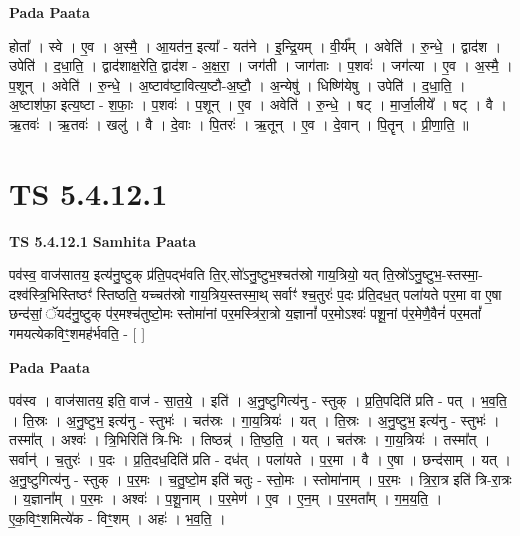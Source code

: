 \documentclass[17pt]{extarticle}
\begin{document}
\textbf{Pada Paata} \newline

होता᳚ । स्वे । ए॒व । अ॒स्मै॒ । आ॒यत॑न॒ इत्या᳚ - यत॑ने । इ॒न्द्रि॒यम् । वी॒र्य᳚म् । अवेति॑ । रु॒न्धे॒ । द्वाद॑श । उपेति॑ । द॒धा॒ति॒ । द्वाद॑शाक्ष॒रेति॒ द्वाद॑श - अ॒क्ष॒रा॒ । जग॑ती । जाग॑ताः । प॒शवः॑ । जग॑त्या । ए॒व । अ॒स्मै॒ । प॒शून् । अवेति॑ । रु॒न्धे॒ । अ॒ष्टाव॑ष्टा॒वित्य॒ष्टौ-अ॒ष्टौ॒ । अ॒न्येषु॑ । धिष्णि॑येषु । उपेति॑ । द॒धा॒ति॒ । अ॒ष्टाश॑फा॒ इत्य॒ष्टा - श॒फाः॒ । प॒शवः॑ । प॒शून् । ए॒व । अवेति॑ । रु॒न्धे॒ । षट् । मा॒र्जा॒लीये᳚ । षट् । वै । ऋ॒तवः॑ । ऋ॒तवः॑ । खलु॑ । वै । दे॒वाः । पि॒तरः॑ । ऋ॒तून् । ए॒व । दे॒वान् । पि॒तॄन् । प्री॒णा॒ति॒ ॥  \newline




\section*{ TS 5.4.12.1 }

\textbf{TS 5.4.12.1 } \newline
\textbf{Samhita Paata} \newline

पव॑स्व॒ वाज॑सातय॒ इत्य॑नु॒ष्टुक् प्र॑ति॒पद्भ॑वति ति॒र्.सो॑ऽनु॒ष्टुभ॒श्चत॑स्रो गाय॒त्रियो॒ यत् ति॒स्रो॑ऽनु॒ष्टुभ॒-स्तस्मा॒-दश्व॑स्त्रि॒भिस्तिष्ठꣳ॑ स्तिष्ठति॒ यच्चत॑स्रो गाय॒त्रिय॒स्तस्मा॒थ् सर्वाꣳ॑ श्च॒तुरः॑ प॒दः प्र॑ति॒दध॒त् पला॑यते पर॒मा वा ए॒षा छन्द॑सां॒ ॅयद॑नु॒ष्टुक् प॑र॒मश्च॑तुष्टो॒मः स्तोमा॑नां पर॒मस्त्रि॑रा॒त्रो य॒ज्ञानां᳚ पर॒मोऽश्वः॑ पशू॒नां प॑र॒मेणै॒वैनं॑ पर॒मतां᳚ गमयत्येकविꣳ॒॒शमह॑र्भवति॒ - [  ] \newline

\textbf{Pada Paata} \newline

पव॑स्व । वाज॑सातय॒ इति॒ वाज॑ - सा॒त॒ये॒ । इति॑ । अ॒नु॒ष्टुगित्य॑नु - स्तुक् । प्र॒ति॒पदिति॑ प्रति - पत् । भ॒व॒ति॒ । ति॒स्रः । अ॒नु॒ष्टुभ॒ इत्य॑नु - स्तुभः॑ । चत॑स्रः । गा॒य॒त्रियः॑ । यत् । ति॒स्रः । अ॒नु॒ष्टुभ॒ इत्य॑नु - स्तुभः॑ । तस्मा᳚त् । अश्वः॑ । त्रि॒भिरिति॑ त्रि-भिः । तिष्ठन्न्॑ । ति॒ष्ठ॒ति॒ । यत् । चत॑स्रः । गा॒य॒त्रियः॑ । तस्मा᳚त् । सर्वान्॑ । च॒तुरः॑ । प॒दः । प्र॒ति॒दध॒दिति॑ प्रति - दध॑त् । पला॑यते । प॒र॒मा । वै । ए॒षा । छन्द॑साम् । यत् । अ॒नु॒ष्टुगित्य॑नु - स्तुक् । प॒र॒मः । च॒तु॒ष्टो॒म इति॑ चतुः - स्तो॒मः । स्तोमा॑नाम् । प॒र॒मः । त्रि॒रा॒त्र इति॑ त्रि-रा॒त्रः । य॒ज्ञाना᳚म् । प॒र॒मः । अश्वः॑ । प॒शू॒नाम् । प॒र॒मेण॑ । ए॒व । ए॒न॒म् । प॒र॒मता᳚म् । ग॒म॒य॒ति॒ । ए॒क॒विꣳ॒॒शमित्ये॑क - विꣳ॒॒शम् । अहः॑ । भ॒व॒ति॒ ।  \newline
\end{document}
